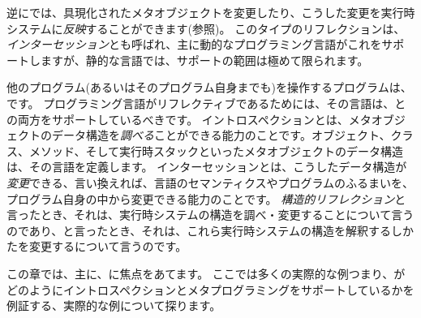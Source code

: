 \documentclass[a4paper,10pt,twoside]{book}
\begin{document}
逆に\st{}では、具現化されたメタオブジェクトを変更したり、こうした変更を実行時システムに\emph{反映}することができます(参照)。
このタイプのリフレクションは、\emph{インターセッション}とも呼ばれ、主に動的なプログラミング言語がこれをサポートしますが、静的な言語では、サポートの範囲は極めて限られます。

他のプログラム(あるいはそのプログラム自身までも)を操作するプログラムは、です。
プログラミング言語がリフレクティブであるためには、その言語は、との両方をサポートしているべきです。
イントロスペクションとは、メタオブジェクトのデータ構造を\emph{調べる}ことができる能力のことです。オブジェクト、クラス、メソッド、そして実行時スタックといったメタオブジェクトのデータ構造は、その言語を定義します。
インターセッションとは、こうしたデータ構造が\emph{変更}できる、言い換えれば、言語のセマンティクスやプログラムのふるまいを、プログラム自身の中から変更できる能力のことです。
\emph{構造的リフレクション}と言ったとき、それは、実行時システムの構造を調べ・変更することについて言うのであり、と言ったとき、それは、これら実行時システムの構造を解釈するしかたを変更するについて言うのです。

この章では、主に、に焦点をあてます。
ここでは多くの実際的な例つまり、\st{}がどのようにイントロスペクションとメタプログラミングをサポートしているかを例証する、実際的な例について探ります。
\end{document}
